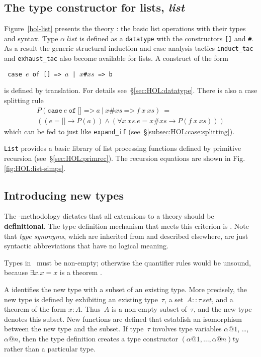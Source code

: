 \subsection{The type constructor for lists, \textit{list}}
\label{subsec:list}

Figure~\ref{hol-list} presents the theory : the basic list
operations with their types and syntax.  Type $\alpha \; list$ is
defined as a \texttt{datatype} with the constructors {\tt[]} and {\tt\#}.
As a result the generic structural induction and case analysis tactics
\texttt{induct\_tac} and \texttt{exhaust\_tac} also become available for
lists.  A  construct of the form
\begin{center}\tt
case $e$ of [] => $a$  |  \(x\)\#\(xs\) => b
\end{center}
is defined by translation.  For details see~\S\ref{sec:HOL:datatype}. There
is also a case splitting rule 
\[
\begin{array}{l}
P(\mathtt{case}~e~\mathtt{of}~\texttt{[] =>}~a ~\texttt{|}~
               x\texttt{\#}xs~\texttt{=>}~f~x~xs) ~= \\
((e = \texttt{[]} \to P(a)) \land
 (\forall x~ xs. e = x\texttt{\#}xs \to P(f~x~xs)))
\end{array}
\]
which can be fed to  just like
\texttt{expand_if} (see~\S\ref{subsec:HOL:case:splitting}).

{\tt List} provides a basic library of list processing functions defined by
primitive recursion (see~\S\ref{sec:HOL:primrec}).  The recursion equations
are shown in Fig.\ts\ref{fig:HOL:list-simps}.



\subsection{Introducing new types} \label{sec:typedef}

The \HOL-methodology dictates that all extensions to a theory should
be \textbf{definitional}.  The type definition mechanism that
meets this criterion is .  Note that \emph{type synonyms},
which are inherited from {\Pure} and described elsewhere, are just
syntactic abbreviations that have no logical meaning.

\begin{warn}
  Types in \HOL\ must be non-empty; otherwise the quantifier rules would be
  unsound, because $\exists x. x=x$ is a theorem \cite[\S7]{paulson-COLOG}.
\end{warn}
A  identifies the new type with a subset of
an existing type.  More precisely, the new type is defined by
exhibiting an existing type~$\tau$, a set~$A::\tau\,set$, and a
theorem of the form $x:A$.  Thus~$A$ is a non-empty subset of~$\tau$,
and the new type denotes this subset.  New functions are defined that
establish an isomorphism between the new type and the subset.  If
type~$\tau$ involves type variables $\alpha@1$, \ldots, $\alpha@n$,
then the type definition creates a type constructor
$(\alpha@1,\ldots,\alpha@n)ty$ rather than a particular type.

